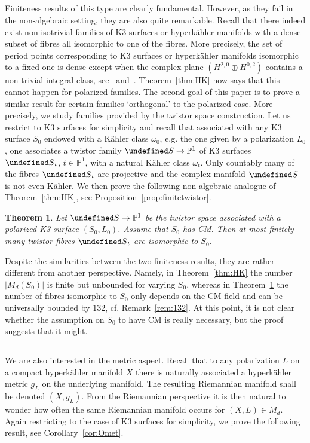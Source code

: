 \documentclass[11pt]{article}
\newtheorem{theo}{Theorem}[section]
\theoremstyle{definition}
\numberwithin{equation}{section}
\numberwithin{figure}{section}
\numberwithin{table}{section}
\let\cal\undefined
\newcommand{\cal}{\mathcal}
\newcommand{\ks}{{\cal S}}
\newcommand{\PP}{\mathbb{P}}
\begin{document}
\subsection{}
Finiteness results of this type are clearly fundamental. However, as they fail in the non-algebraic setting, they are also quite remarkable. Recall that there indeed exist non-isotrivial families of K3 surfaces or hyperk\"ahler manifolds with a dense subset of fibres all isomorphic to one of the fibres. More precisely, the set of period points corresponding to K3 surfaces or hyperk\"ahler manifolds isomorphic to a fixed one is dense except when the complex plane $(H^{2,0}\oplus H^{0,2})$ contains a non-trivial integral class, see~\cite{Verb2,Verb3} and~\cite[Remark~5.7]{BL}. Theorem~\ref{thm:HK} now says that this cannot happen for polarized families. The second goal of this paper is to prove a similar result for certain families `orthogonal' to the polarized case. More precisely, we study families provided by the twistor space construction. Let us restrict to K3 surfaces for simplicity and recall that associated with any K3 surface $S_0$ endowed with a K\"ahler class $\omega_0$, e.g. the one given by a polarization $L_0$, one associates a twistor family $\ks\to\PP^1$ of K3 surfaces $\ks_t$, $t\in\PP^1$, with a natural K\"ahler class $\omega_t$. Only countably many of the fibres $\ks_t$ are projective and the complex manifold $\ks$ is not even K\"ahler. We then prove the following non-algebraic analogue of Theorem~\ref{thm:HK}, see Proposition~\ref{prop:finitetwistor}.

\begin{theo}\label{thm:twistor}
Let $\ks\to\PP^1$ be the twistor space associated with
a polarized K3 surface $(S_0,L_0)$. Assume that $S_0$ has CM. Then at most finitely many twistor fibres $\ks_t$ are isomorphic to $S_0$.
\end{theo}

Despite the similarities between the two finiteness results, they are rather different from another perspective. Namely, in Theorem~\ref{thm:HK} the number $|M_d(S_0)|$ is finite but unbounded for varying $S_0$, whereas in Theorem~\ref{thm:twistor} the number of fibres isomorphic to $S_0$ only depends on the CM field and can be universally bounded by $132$, cf. Remark~\ref{rem:132}. At this point, it is not clear whether the assumption on $S_0$ to have CM is really necessary, but the proof suggests that it might.

\subsection{}
We are also interested in the metric aspect. Recall that to any polarization $L$ on a compact hyperk\"ahler manifold $X$ there is naturally associated a hyperk\"ahler metric $g_L$ on the underlying manifold. The resulting Riemannian manifold shall be denoted $(X,g_L)$. From the Riemannian perspective it is then natural to wonder how often the same Riemannian manifold occurs for $(X,L)\in M_d$. Again restricting to the case of K3 surfaces for simplicity, we prove the following result, see Corollary~\ref{cor:Omet}.
\end{document}

